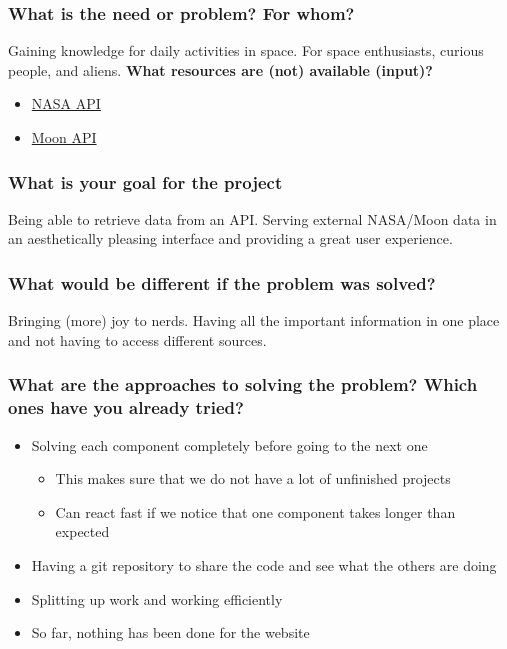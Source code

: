 \documentclass{article}
\begin{document}
\subsubsection*{What is the need or problem? For whom?}
Gaining knowledge for daily activities in space. For space enthusiasts, curious people, and aliens.
\textbf{What resources are (not) available (input)?}
\begin{itemize}
    \item \href{https://api.nasa.gov/}{NASA API}
    \item \href{https://dev.qweather.com/en/docs/api/astronomy/moon-and-moon-phase/}{Moon API}
\end{itemize}
\subsubsection*{What is your goal for the project}
Being able to retrieve data from an API. Serving external NASA/Moon data in an aesthetically pleasing interface and providing a great user experience.
\subsubsection*{What would be different if the problem was solved?}
Bringing (more) joy to nerds. Having all the important information in one place and not having to access different sources.
\subsubsection*{What are the approaches to solving the problem? Which ones have you already tried?}
\begin{itemize}
    \item Solving each component completely before going to the next one
          \begin{itemize}
              \item This makes sure that we do not have a lot of unfinished projects
              \item Can react fast if we notice that one component takes longer than expected
          \end{itemize}
    \item Having a git repository to share the code and see what the others are doing
    \item Splitting up work and working efficiently
    \item So far, nothing has been done for the website
\end{itemize}
\end{document}
